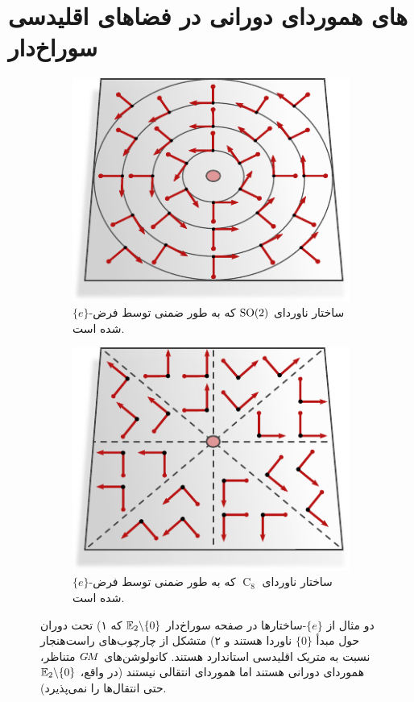 

\section{های هموردای دورانی در فضاهای اقلیدسی سوراخ‌دار}
\label{sec:instantiations_euclidean_polar}

\begin{figure}
	\centering
	\begin{subfigure}[b]{0.47\textwidth}
		\centering
		\includegraphics[width=.7\textwidth]{figures/G_structure_R2_no_origin_SO2.pdf}
		\captionsetup{format=hang, width=.82\textwidth}
		\caption{\small
			$\{e\}$-ساختار ناوردای $\operatorname{SO}(2)$ که به طور ضمنی توسط \citet{finzi2020generalizing} فرض شده است.
		}
		\label{fig:G_structure_R2_no_origin_SO2}
	\end{subfigure}
	\hfill
	\begin{subfigure}[b]{0.47\textwidth}
		\centering
		\includegraphics[width=.7\textwidth]{figures/G_structure_R2_no_origin_C8.pdf}
		\captionsetup{format=hang, width=.78\textwidth}
		\caption{\small
			$\{e\}$-ساختار ناوردای $\operatorname{C}_8$ که به طور ضمنی توسط \citet{chidester2019rotation} فرض شده است.
		}
		\label{fig:G_structure_R2_no_origin_C8}
	\end{subfigure}
	\caption{\small
		دو مثال از $\{e\}$-ساختارها در صفحه سوراخ‌دار $\mathbb{E}_2 \backslash \{0\}$ که
		۱) تحت دوران حول مبدأ $\{0\}$ ناوردا هستند و
		۲) متشکل از چارچوب‌های راست‌هنجار نسبت به متریک اقلیدسی استاندارد هستند.
		کانولوشن‌های $G\mkern-1.4muM$ متناظر، هموردای دورانی هستند اما هموردای انتقالی نیستند (در واقع، $\mathbb{E}_2 \backslash \{0\}$ حتی انتقال‌ها را نمی‌پذیرد).
	}
	\label{fig:G_structures_R2_no_origin}
\end{figure}


